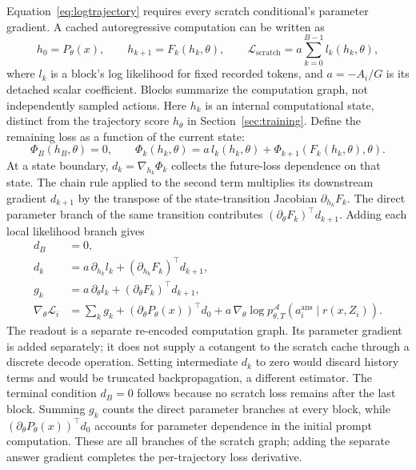 \documentclass[11pt]{article}
\begin{document}
Equation~\eqref{eq:logtrajectory} requires every scratch conditional's parameter gradient. A cached autoregressive computation can be written as
\begin{equation}
 h_0=P_\theta(x),\qquad h_{k+1}=F_k(h_k,\theta),\qquad
 \mathcal L_{\mathrm{scratch}}=a\sum_{k=0}^{B-1}l_k(h_k,\theta),
\end{equation}
where $l_k$ is a block's log likelihood for fixed recorded tokens, and $a=-A_i/G$ is its detached scalar coefficient. Blocks summarize the computation graph, not independently sampled actions. Here $h_k$ is an internal computational state, distinct from the trajectory score $h_\theta$ in Section~\ref{sec:training}. Define the remaining loss as a function of the current state:
\begin{equation}
 \Phi_B(h_B,\theta)=0,\qquad
 \Phi_k(h_k,\theta)=a\,l_k(h_k,\theta)
                    +\Phi_{k+1}(F_k(h_k,\theta),\theta).
\end{equation}
At a state boundary, $d_k=\nabla_{h_k}\Phi_k$ collects the future-loss dependence on that state. The chain rule applied to the second term multiplies its downstream gradient $d_{k+1}$ by the transpose of the state-transition Jacobian $\partial_{h_k}F_k$. The direct parameter branch of the same transition contributes $(\partial_\theta F_k)^\top d_{k+1}$. Adding each local likelihood branch gives
\begin{align}
 d_B&=0,\\
 d_k&=a\,\partial_{h_k}l_k+(\partial_{h_k}F_k)^\top d_{k+1},\label{eq:cachecotangent}\\
 g_k&=a\,\partial_\theta l_k+(\partial_\theta F_k)^\top d_{k+1},\\
 \nabla_\theta\mathcal L_i&=\sum_kg_k+(\partial_\theta P_\theta(x))^\top d_0
             +a\,\nabla_\theta\log p^{\mathcal A}_{\theta,T}(a_i^{\mathrm{ans}}\mid r(x,Z_i)).
 \label{eq:fullhistorygradient}
\end{align}
The readout is a separate re-encoded computation graph. Its parameter gradient is added separately; it does not supply a cotangent to the scratch cache through a discrete decode operation. Setting intermediate $d_k$ to zero would discard history terms and would be truncated backpropagation, a different estimator.
The terminal condition $d_B=0$ follows because no scratch loss remains after the last block. Summing $g_k$ counts the direct parameter branches at every block, while $(\partial_\theta P_\theta(x))^\top d_0$ accounts for parameter dependence in the initial prompt computation. These are all branches of the scratch graph; adding the separate answer gradient completes the per-trajectory loss derivative.
\end{document}
